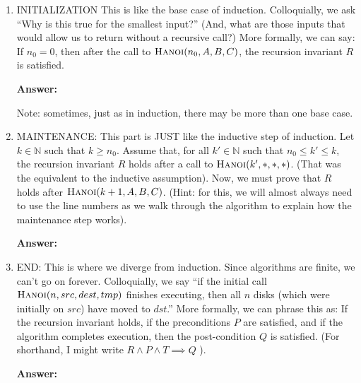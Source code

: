 \documentclass{article}
\def\N{{\mathbb N}}
\newcommand{\answer}{\textbf{Answer:}\vspace{1.8in}}
\begin{document}
\begin{enumerate}
    \pagebreak
    \item INITIALIZATION This is like the base case of induction.  Colloquially,
        we ask ``Why is this
        true for the smallest input?'' (And, what are those inputs that
        would allow us to return without a recursive call?)  More formally, we
        can say: If $n_0=0$, then after the call to
        $\textsc{Hanoi}(n_0,A,B,C)$, the recursion invariant $R$ is satisfied.

        \answer

        Note: sometimes, just as in induction, there may be more than one base case.

    \item MAINTENANCE: This part is JUST like the inductive step of induction.
        Let $k \in \N$ such that $k \geq n_0$.  Assume that, for all $k'\in \N$ such that
        $n_0 \leq k' \leq k$, the recursion invariant $R$ holds after a call to
        $\textsc{Hanoi}(k',*,*,*)$. (That was the equivalent to the inductive
        assumption).  Now, we must prove that $R$ holds after
        $\textsc{Hanoi}(k+1,A,B,C)$. (Hint: for this, we will almost always need
        to use the line numbers as we walk
        through the algorithm to explain how the maintenance step works).

        \answer

    \item END: This is where we diverge from induction.  Since algorithms are
        finite, we can't go on forever. Colloquially, we say ``if the initial call
        $\textsc{Hanoi}(n,src,dest,tmp)$ finishes executing, then all $n$ disks
        (which were initially on $src$) have moved to $dst$.'' More formally, we
        can phrase this as: If the recursion invariant holds, if the
        preconditions $P$ are satisfied, and if the algorithm
        completes execution, then the post-condition $Q$ is satisfied.
        (For shorthand, I might write $R \wedge P \wedge T \implies Q$ ).

        \answer

\end{enumerate}



\end{document}
